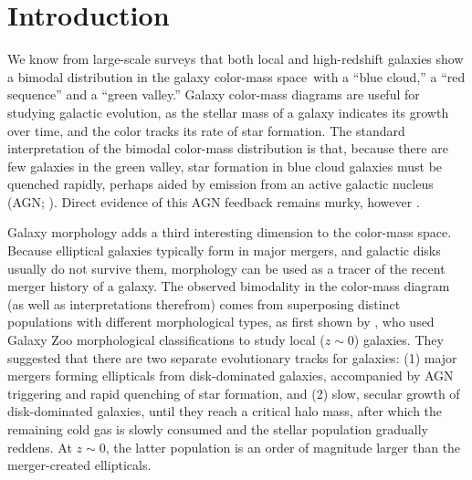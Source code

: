\section{Introduction} \label{sec:intro}

We know from large-scale surveys that both local and high-redshift galaxies show a bimodal distribution in the galaxy color-mass space\,\citep{strateva_01,baldry_04,baldry_06,brammer_09} with a ``blue cloud,'' a ``red sequence'' and a ``green valley.'' Galaxy color-mass diagrams are useful for studying galactic evolution, as the stellar mass of a galaxy indicates its growth over time, and the color tracks its rate of star formation. The standard interpretation of the bimodal color-mass distribution is that, because there are few galaxies in the green valley, star formation in blue cloud galaxies must be quenched rapidly, perhaps aided by emission from an active galactic nucleus (AGN; \citealp{bell_04,faber_07}). Direct evidence of this AGN feedback remains murky, however \citep{harrison_17}.

Galaxy morphology adds a third interesting dimension to the color-mass space. Because elliptical galaxies typically form in major mergers, and galactic disks usually do not survive them, morphology can be used as a tracer of the recent merger history of a galaxy. The observed bimodality in the color-mass diagram (as well as interpretations therefrom) comes from superposing distinct populations with different morphological types, as first shown by \citet{schawinski_14_green_herring}, who used Galaxy Zoo morphological classifications to study local ($z\sim0$) galaxies. They suggested that there are two separate evolutionary tracks for galaxies: (1) major mergers forming ellipticals from disk-dominated galaxies, accompanied by AGN triggering and rapid quenching of star formation, and (2) slow, secular growth of disk-dominated galaxies, until they reach a critical halo mass, after which the remaining cold gas is slowly consumed and the stellar population gradually reddens. At $z\sim0$, the latter population is an order of magnitude larger than the merger-created ellipticals. 


